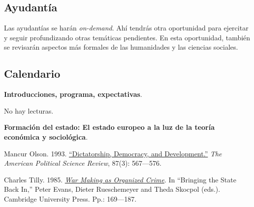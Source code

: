\documentclass[letterpaper]{article}
\renewenvironment{itemize}{
  \begin{list}{}{
    \setlength{\leftmargin}{1.5em}
  }
}{
  \end{list}
}
\begin{document}
\subsection*{Ayudant\'ia}

Las ayudant\'ias se har\'an \emph{on-demand}. Ah\'i tendr\'as otra oportunidad para ejercitar y seguir profundizando otras tem\'aticas pendientes. En esta oportunidad, tambi\'en se revisar\'an aspectos m\'as formales de las humanidades y las ciencias sociales. 


\subsection*{Calendario}



\begin{enumerate}[label=\roman*.]

  \item {}
    \begin{itemize}
      \item[1.] {\bf Introducciones, programa, expectativas}.
        \begin{itemize} 
          \item[$\circ$] No hay lecturas.
        \end{itemize}
    \end{itemize}


	\item {}
		\begin{itemize}
			
			\item[2.] {\bf Formaci\'on del estado: El estado europeo a la luz de la teor\'ia econ\'omica y sociol\'ogica}.
				\begin{itemize} 
					\item[$\circ$] Mancur Olson. 1993. \href{https://github.com/hbahamonde/Ciencia_Politica_II/raw/master/Readings/Olson.pdf}{``Dictatorship, Democracy, and Development.''} \emph{The American Political Science Review}, 87(3): 567---576.
					
					\item[$\circ$] Charles Tilly. 1985. \href{https://github.com/hbahamonde/Ciencia_Politica_II/raw/master/Readings/Tilly.pdf}{\emph{War Making as Organized Crime}}. In ``Bringing the State Back In,'' Peter Evans, Dieter Rueschemeyer and Theda Skocpol (eds.). Cambridge University Press. Pp.: 169---187.
				\end{itemize}
			

\end{itemize}
\end{enumerate}
\end{document}
